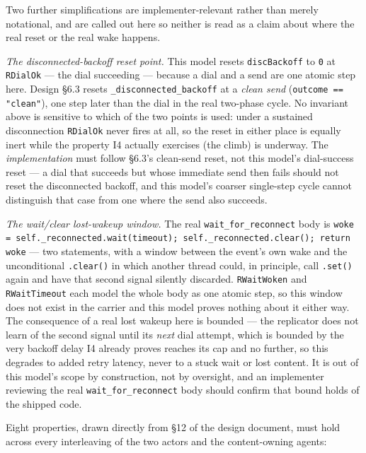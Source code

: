 \documentclass[a4paper,10pt,fleqn]{article}
\begin{document}
Two further simplifications are implementer-relevant rather than merely
notational, and are called out here so neither is read as a claim about
where the real reset or the real wake happens.

\emph{The disconnected-backoff reset point.} This model resets
\texttt{discBackoff} to \texttt{0} at \texttt{RDialOk} --- the dial
succeeding --- because a dial and a send are one atomic step here.  Design
\S6.3 resets \texttt{\_disconnected\_backoff} at a \emph{clean send}
(\texttt{outcome == "clean"}), one step later than the dial in the real
two-phase cycle.  No invariant above is sensitive to which of the two
points is used: under a sustained disconnection \texttt{RDialOk} never
fires at all, so the reset in either place is equally inert while the
property I4 actually exercises (the climb) is underway.  The
\emph{implementation} must follow \S6.3's clean-send reset, not this
model's dial-success reset --- a dial that succeeds but whose immediate
send then fails should not reset the disconnected backoff, and this
model's coarser single-step cycle cannot distinguish that case from one
where the send also succeeds.

\emph{The wait/clear lost-wakeup window.} The real
\texttt{wait\_for\_reconnect} body is \texttt{woke = self.\_reconnected.wait(timeout);
self.\_reconnected.clear(); return woke} --- two statements, with a window
between the event's own wake and the unconditional \texttt{.clear()} in
which another thread could, in principle, call \texttt{.set()} again and
have that second signal silently discarded.  \texttt{RWaitWoken} and
\texttt{RWaitTimeout} each model the whole body as one atomic step, so
this window does not exist in the carrier and this model proves nothing
about it either way.  The consequence of a real lost wakeup here is
bounded --- the replicator does not learn of the second signal until its
\emph{next} dial attempt, which is bounded by the very backoff delay I4
already proves reaches its cap and no further, so this degrades to added
retry latency, never to a stuck wait or lost content.  It is out of this
model's scope by construction, not by oversight, and an implementer
reviewing the real \texttt{wait\_for\_reconnect} body should confirm that
bound holds of the shipped code.

Eight properties, drawn directly from \S12 of the design document, must hold
across every interleaving of the two actors and the content-owning agents:
\end{document}
